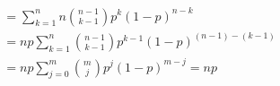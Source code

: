 \documentclass[preview]{standalone}
\begin{document}
\begin{align*}
&= \sum ^{n} _{k=1} n {{n-1}\choose{k-1}} p^{k} (1-p)^{n-k}\\ &= n p \sum ^{n} _{k=1} {{n-1}\choose{k-1}} p^{k-1} (1-p)^{(n-1)-(k-1)}\\ &= n p \sum ^{m} _{j=0} {{m}\choose{j}} p^{j} (1-p)^{m-j} = np
\end{align*}
\end{document}
